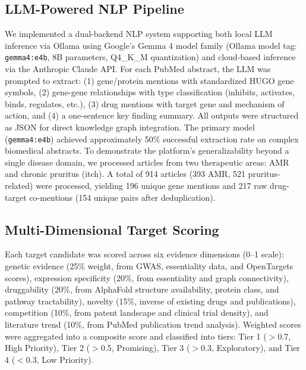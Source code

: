 \documentclass[12pt,a4paper]{article}
\begin{document}
\subsection{LLM-Powered NLP Pipeline}
We implemented a dual-backend NLP system supporting both local LLM inference via Ollama \citep{ollama2024} using Google's Gemma 4 model family (Ollama model tag: \texttt{gemma4:e4b}, 8B parameters, Q4\_K\_M quantization) and cloud-based inference via the Anthropic Claude API. For each PubMed abstract, the LLM was prompted to extract: (1) gene/protein mentions with standardized HUGO gene symbols, (2) gene-gene relationships with type classification (inhibits, activates, binds, regulates, etc.), (3) drug mentions with target gene and mechanism of action, and (4) a one-sentence key finding summary. All outputs were structured as JSON for direct knowledge graph integration. The primary model (\texttt{gemma4:e4b}) achieved approximately 50\% successful extraction rate on complex biomedical abstracts. To demonstrate the platform's generalizability beyond a single disease domain, we processed articles from two therapeutic areas: AMR and chronic pruritus (itch). A total of 914 articles (393 AMR, 521 pruritus-related) were processed, yielding 196 unique gene mentions and 217 raw drug-target co-mentions (154 unique pairs after deduplication).

\subsection{Multi-Dimensional Target Scoring}
Each target candidate was scored across six evidence dimensions (0--1 scale): genetic evidence (25\% weight, from GWAS, essentiality data, and OpenTargets scores), expression specificity (20\%, from essentiality and graph connectivity), druggability (20\%, from AlphaFold structure availability, protein class, and pathway tractability), novelty (15\%, inverse of existing drugs and publications), competition (10\%, from patent landscape and clinical trial density), and literature trend (10\%, from PubMed publication trend analysis). Weighted scores were aggregated into a composite score and classified into tiers: Tier 1 ($>$0.7, High Priority), Tier 2 ($>$0.5, Promising), Tier 3 ($>$0.3, Exploratory), and Tier 4 ($<$0.3, Low Priority).
\end{document}
